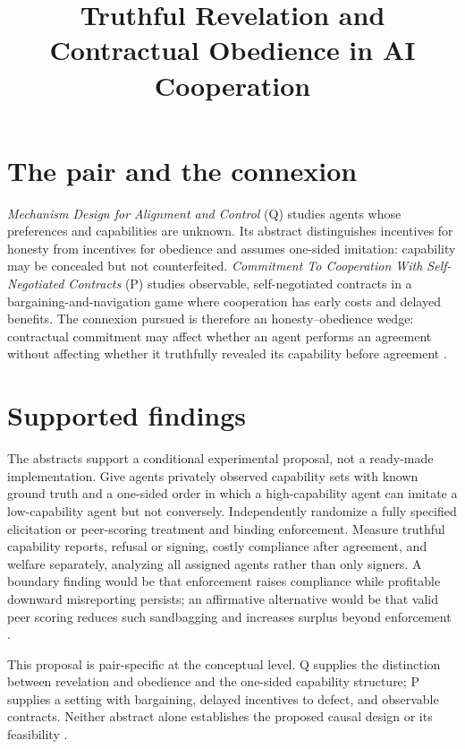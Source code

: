 \documentclass{article}
\title{Truthful Revelation and Contractual Obedience in AI Cooperation}
\begin{document}
\maketitle

\section{The pair and the connexion}

\emph{Mechanism Design for Alignment and Control} (Q) studies agents whose preferences and capabilities are unknown.  Its abstract distinguishes incentives for honesty from incentives for obedience and assumes one-sided imitation: capability may be concealed but not counterfeited.  \emph{Commitment To Cooperation With Self-Negotiated Contracts} (P) studies observable, self-negotiated contracts in a bargaining-and-navigation game where cooperation has early costs and delayed benefits.  The connexion pursued is therefore an honesty--obedience wedge: contractual commitment may affect whether an agent performs an agreement without affecting whether it truthfully revealed its capability before agreement .

\section{Supported findings}

The abstracts support a conditional experimental proposal, not a ready-made implementation.  Give agents privately observed capability sets with known ground truth and a one-sided order in which a high-capability agent can imitate a low-capability agent but not conversely.  Independently randomize a fully specified elicitation or peer-scoring treatment and binding enforcement.  Measure truthful capability reports, refusal or signing, costly compliance after agreement, and welfare separately, analyzing all assigned agents rather than only signers.  A boundary finding would be that enforcement raises compliance while profitable downward misreporting persists; an affirmative alternative would be that valid peer scoring reduces such sandbagging and increases surplus beyond enforcement .

This proposal is pair-specific at the conceptual level.  Q supplies the distinction between revelation and obedience and the one-sided capability structure; P supplies a setting with bargaining, delayed incentives to defect, and observable contracts.  Neither abstract alone establishes the proposed causal design or its feasibility .
\end{document}
